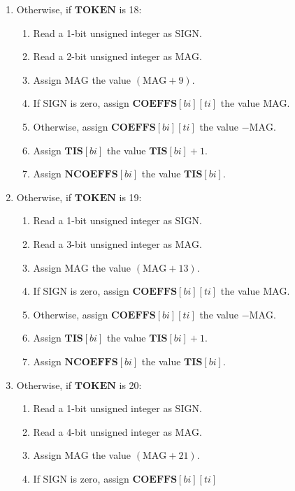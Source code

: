 \documentclass[9pt,letterpaper]{book}
\newcommand{\idx}[1]{{\ensuremath{\mathit{#1}}}}
\newcommand{\bi}{\idx{bi}}
\newcommand{\ti}{\idx{ti}}
\newcommand{\bitvar}[1]{\ensuremath{\mathbf{\bm{#1}}}}
\newcommand{\locvar}[1]{\ensuremath{\mathrm{#1}}}
\numberwithin{equation}{chapter}
\numberwithin{figure}{chapter}
\numberwithin{table}{chapter}
\begin{document}
\begin{enumerate}
\begin{enumerate}
\end{enumerate}
\item
Otherwise, if \bitvar{TOKEN} is 18:
\begin{enumerate}
\item
Read a 1-bit unsigned integer as \locvar{SIGN}.
\item
Read a 2-bit unsigned integer as \locvar{MAG}.
\item
Assign \locvar{MAG} the value $(\locvar{MAG}+9)$.
\item
If \locvar{SIGN} is zero, assign $\bitvar{COEFFS}[\bitvar{\bi}][\bitvar{\ti}]$
 the value $\locvar{MAG}$.
\item
Otherwise, assign $\bitvar{COEFFS}[\bitvar{\bi}][\bitvar{\ti}]$ the value
 $-\locvar{MAG}$.
\item
Assign $\bitvar{TIS}[\bitvar{\bi}]$ the value $\bitvar{TIS}[\bitvar{\bi}]+1$.
\item
Assign $\bitvar{NCOEFFS}[\bitvar{\bi}]$ the value $\bitvar{TIS}[\bitvar{\bi}]$.
\end{enumerate}
\item
Otherwise, if \bitvar{TOKEN} is 19:
\begin{enumerate}
\item
Read a 1-bit unsigned integer as \locvar{SIGN}.
\item
Read a 3-bit unsigned integer as \locvar{MAG}.
\item
Assign \locvar{MAG} the value $(\locvar{MAG}+13)$.
\item
If \locvar{SIGN} is zero, assign $\bitvar{COEFFS}[\bitvar{\bi}][\bitvar{\ti}]$
 the value $\locvar{MAG}$.
\item
Otherwise, assign $\bitvar{COEFFS}[\bitvar{\bi}][\bitvar{\ti}]$ the value
 $-\locvar{MAG}$.
\item
Assign $\bitvar{TIS}[\bitvar{\bi}]$ the value $\bitvar{TIS}[\bitvar{\bi}]+1$.
\item
Assign $\bitvar{NCOEFFS}[\bitvar{\bi}]$ the value $\bitvar{TIS}[\bitvar{\bi}]$.
\end{enumerate}
\item
Otherwise, if \bitvar{TOKEN} is 20:
\begin{enumerate}
\item
Read a 1-bit unsigned integer as \locvar{SIGN}.
\item
Read a 4-bit unsigned integer as \locvar{MAG}.
\item
Assign \locvar{MAG} the value $(\locvar{MAG}+21)$.
\item
If \locvar{SIGN} is zero, assign $\bitvar{COEFFS}[\bitvar{\bi}][\bitvar{\ti}]$

\end{enumerate}
\end{enumerate}
\end{document}
